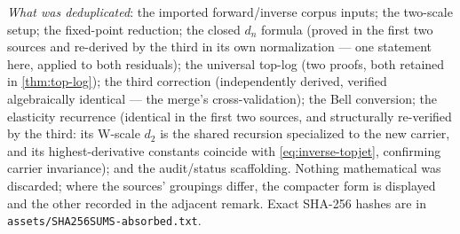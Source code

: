 \documentclass[11pt,oneside]{article}
\numberwithin{equation}{section}
\theoremstyle{definition}
\theoremstyle{remark}
\begin{document}
\emph{What was deduplicated}: the imported forward/inverse corpus
inputs; the two-scale setup; the fixed-point reduction; the closed
$d_n$ formula (proved in the first two sources and re-derived by the
third in its own normalization --- one statement here, applied to
both residuals); the universal top-log (two proofs, both retained in
\cref{thm:top-log}); the third correction (independently derived,
verified algebraically identical --- the merge's cross-validation);
the Bell conversion; the elasticity recurrence (identical in the
first two sources, and structurally re-verified by the third:
its W-scale $d_2$ is the shared recursion specialized to the new
carrier, and its highest-derivative constants coincide with
\eqref{eq:inverse-topjet}, confirming carrier invariance); and the
audit/status scaffolding.  Nothing mathematical was discarded; where
the sources' groupings differ, the compacter form is displayed and
the other recorded in the adjacent remark.  Exact SHA-256 hashes are
in \nolinkurl{assets/SHA256SUMS-absorbed.txt}.
\end{document}

